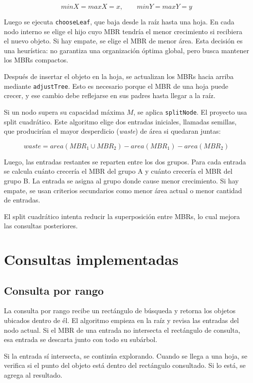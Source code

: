 \documentclass[11pt,a4paper]{article}
\begin{document}
\[
minX = maxX = x, \qquad minY = maxY = y
\]

Luego se ejecuta \texttt{chooseLeaf}, que baja desde la raíz hasta una hoja. En cada nodo interno se elige el hijo cuyo MBR tendría el menor crecimiento si recibiera el nuevo objeto. Si hay empate, se elige el MBR de menor área. Esta decisión es una heurística: no garantiza una organización óptima global, pero busca mantener los MBRs compactos.

Después de insertar el objeto en la hoja, se actualizan los MBRs hacia arriba mediante \texttt{adjustTree}. Esto es necesario porque el MBR de una hoja puede crecer, y ese cambio debe reflejarse en sus padres hasta llegar a la raíz.

Si un nodo supera su capacidad máxima $M$, se aplica \texttt{splitNode}. El proyecto usa split cuadrático. Este algoritmo elige dos entradas iniciales, llamadas semillas, que producirían el mayor desperdicio (\textit{waste}) de área si quedaran juntas:

\[
waste = area(MBR_1 \cup MBR_2) - area(MBR_1) - area(MBR_2)
\]

Luego, las entradas restantes se reparten entre los dos grupos. Para cada entrada se calcula cuánto crecería el MBR del grupo A y cuánto crecería el MBR del grupo B. La entrada se asigna al grupo donde cause menor crecimiento. Si hay empate, se usan criterios secundarios como menor área actual o menor cantidad de entradas.

El split cuadrático intenta reducir la superposición entre MBRs, lo cual mejora las consultas posteriores.

\section{Consultas implementadas}

\subsection{Consulta por rango}

La consulta por rango recibe un rectángulo de búsqueda y retorna los objetos ubicados dentro de él. El algoritmo empieza en la raíz y revisa las entradas del nodo actual. Si el MBR de una entrada no intersecta el rectángulo de consulta, esa entrada se descarta junto con todo su subárbol.

Si la entrada sí intersecta, se continúa explorando. Cuando se llega a una hoja, se verifica si el punto del objeto está dentro del rectángulo consultado. Si lo está, se agrega al resultado.
\end{document}
